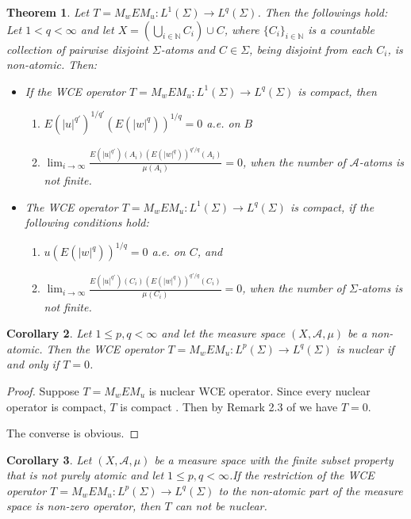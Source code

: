 \documentclass{amsart}
\newtheorem{thm}{Theorem}[section]
\newtheorem{cor}[thm]{Corollary}
\theoremstyle{definition}\newtheorem{defn}[thm]{Definition}
\theoremstyle{remark}
\numberwithin{equation}{section}
\newcommand{\A}{\mathcal{A}}
\begin{document}
\begin{thm}
Let $T=M_wEM_u: L^1(\Sigma) \to L^q(\Sigma)$. Then the followings hold:
 Let \(1< q< \infty\) and let \(X = (\bigcup_{i\in \mathbb{N}}C_{i})\cup C\), where \(\{C_{i}\}_{i\in \mathbb{N}}\) is a countable collection of pairwise disjoint \(\Sigma\)-atoms and \(C\in \Sigma\), being disjoint from each \(C_{i}\), is non-atomic. Then:
\begin{itemize}
\item If the WCE operator $T = M_w E M_u : L^{1}(\Sigma) \to L^{q}(\Sigma)$ is compact, then
	\begin{enumerate}
		\item \(E(|u|^{q'})^{1 / q'}(E(|w|^q))^{1 / q} = 0\) a.e. on $B$
		\item \(\lim_{i\to \infty}\frac{E(|u|^{q'})(A_{i})(E(|w|^q))^{q' / q}(A_{i})}{\mu(A_{i})} = 0\), when the number of \(\mathcal{A}\)-atoms is not finite.
	\end{enumerate}
\item The WCE operator $T = M_w E M_u : L^{1}(\Sigma) \to L^{q}(\Sigma)$ is compact, if the following conditions hold:
	\begin{enumerate}
		\item \(u(E(|w|^q))^{1 / q} = 0\) a.e. on $C$, and
		\item \(\lim_{i\to \infty}\frac{E(|u|^{q'})(C_{i})(E(|w|^q))^{q' / q}(C_{i})}{\mu(C_{i})} = 0\), when the number of \(\Sigma\)-atoms is not finite.
	\end{enumerate}
\end{itemize}
\end{thm}

\begin{cor}\label{cor2.5}
	Let $1 \leq p,q < \infty$ and let the measure space $(X, \A, \mu)$ be a non-atomic. Then the WCE operator $T = M_w E M_u : L^p(\Sigma) \to L^q(\Sigma)$ is nuclear if and only if $T = 0$.
\end{cor}

\begin{proof}
	Suppose $T = M_w E M_u$ is nuclear WCE operator. Since every nuclear operator is compact, $T$ is compact .  Then by Remark 2.3 of \cite{Estaremi2014} we have $T = 0$.
	
	The converse is obvious.
\end{proof}
\begin{cor}
	Let $(X, \A, \mu)$ be a measure space with the finite subset property that is not purely atomic and let $1 \leq p,q < \infty$.If the restriction of the WCE operator $T = M_w E M_u : L^p(\Sigma) \to L^q(\Sigma)$  to the non-atomic part of the measure space is non-zero operator, then $T$ can not be nuclear.
\end{cor}
\end{document}
